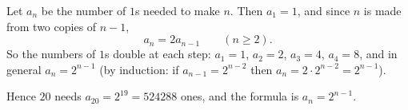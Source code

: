 Let $a_n$ be the number of $1$s needed to make $n$. Then $a_1=1$, and since $n$ is made from two copies of $n-1$,
\[
a_n=2a_{n-1}\qquad(n\ge2).
\]
So the numbers of $1$s double at each step: $a_1=1$, $a_2=2$, $a_3=4$, $a_4=8$, and in general $a_n=2^{n-1}$ (by induction: if $a_{n-1}=2^{n-2}$ then $a_n=2\cdot2^{n-2}=2^{n-1}$).

Hence $20$ needs $a_{20}=2^{19}=\boxed{524288}$ ones, and the formula is $a_n=2^{n-1}$.
